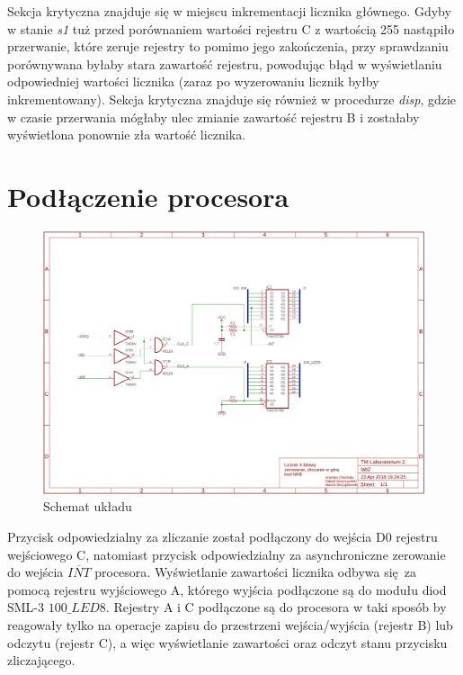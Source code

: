 \documentclass[fleqn]{article}
\begin{document}
Sekcja krytyczna znajduje się w miejscu inkrementacji licznika głównego. Gdyby w stanie \textit{s1} tuż przed porównaniem wartości rejestru C z wartością 255 nastąpiło przerwanie, które zeruje rejestry to pomimo jego zakończenia, przy sprawdzaniu porównywana byłaby stara zawartość rejestru, powodując błąd w wyświetlaniu odpowiedniej wartości licznika (zaraz po wyzerowaniu licznik byłby inkrementowany). Sekcja krytyczna znajduje się również w procedurze \textit{disp}, gdzie w czasie przerwania mógłaby ulec zmianie zawartość rejestru B i zostałaby wyświetlona ponownie zła wartość licznika.

\pagebreak

\noindent\begin{minipage}{.45\textwidth}
	
\end{minipage}\hfill
\noindent\begin{minipage}{.45\textwidth}
	
\end{minipage}\hfill

\pagebreak

\section{Podłączenie procesora}

\begin{figure}[H]
	\centering
	\includegraphics[width=\textwidth]{img/schematic.pdf}
	\caption{Schemat układu}
	\label{fig:schematic}
\end{figure}

Przycisk odpowiedzialny za zliczanie został podłączony do wejścia D0 rejestru wejściowego C, natomiast przycisk odpowiedzialny za asynchroniczne zerowanie do wejścia $\overline{INT}$ procesora.
Wyświetlanie zawartości licznika odbywa się za pomocą rejestru wyjściowego A, którego wyjścia podłączone są do modułu diod SML-3 $\textit{100\_LED8}$. Rejestry A i C podłączone są do procesora w taki sposób by reagowały tylko na operacje zapisu do przestrzeni wejścia/wyjścia (rejestr B) lub odczytu (rejestr C), a więc wyświetlanie zawartości oraz odczyt stanu przycisku zliczającego.
\end{document}
